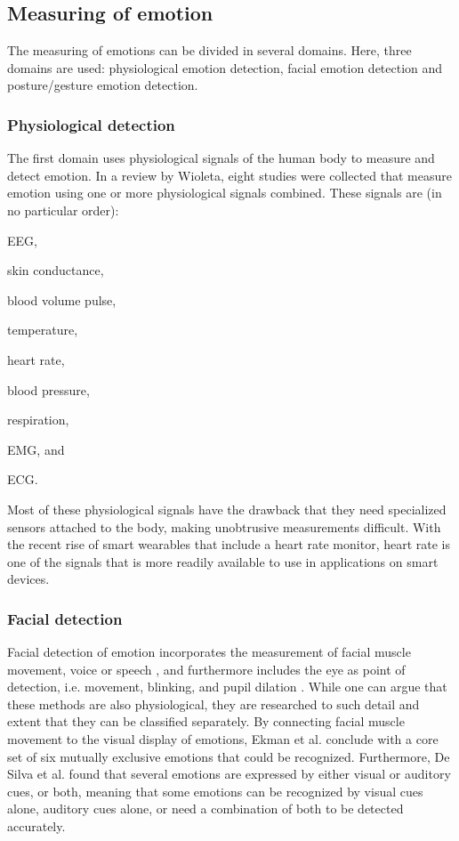 \documentclass{sigchi}
\begin{document}
\subsection{Measuring of emotion}
The measuring of emotions can be divided in several domains. Here, three domains are used: physiological emotion detection, facial emotion detection and posture/gesture emotion detection.

\subsubsection{Physiological detection} %
\label{sub:physiology}
The first domain uses physiological signals of the human body to measure and detect emotion. In a review by Wioleta\cite{Wioleta2013}, eight studies were collected that measure emotion using one or more physiological signals combined. These signals are (in no particular order):
\begin{enumerate*}[label=(\alph*)]
  \item EEG,
  \item skin conductance,
  \item blood volume pulse,
  \item temperature,
  \item heart rate,
  \item blood pressure,
  \item respiration,
  \item EMG, and
  \item ECG.
\end{enumerate*}
Most of these physiological signals have the drawback that they need specialized sensors attached to the body, making unobtrusive measurements difficult. With the recent rise of smart wearables that include a heart rate monitor, heart rate is one of the signals that is more readily available to use in applications on smart devices.

\subsubsection{Facial detection} %
\label{sub:facial_detection}
Facial detection of emotion incorporates the measurement of facial muscle movement, voice or speech \cite{Ververidis2004}, and furthermore includes the eye as point of detection, i.e. movement, blinking, and pupil dilation \cite{Soleymani2015}. While one can argue that these methods are also physiological, they are researched to such detail and extent that they can be classified separately. By connecting facial muscle movement to the visual display of emotions, Ekman et al. \cite{Ekman1969} conclude with a core set of six mutually exclusive emotions that could be recognized. Furthermore, De Silva et al. \cite{Silva1997} found that several emotions are expressed by either visual or auditory cues, or both, meaning that some emotions can be recognized by visual cues alone, auditory cues alone, or need a combination of both to be detected accurately.
\end{document}
